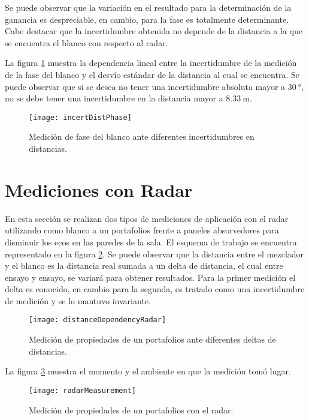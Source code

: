 Se puede observar que la variación en el resultado para la determinación de la ganancia es despreciable, en cambio, para la fase es totalmente determinante. Cabe destacar que la incertidumbre obtenida no depende de la distancia a la que se encuentra el blanco con respecto al radar.

La figura \ref{fig:incertDistSim} muestra la dependencia lineal entre la incertidumbre de la medición de la fase del blanco y el desvío estándar de la distancia al cual se encuentra. Se puede observar que si se desea no tener una incertidumbre absoluta mayor a $\SI{30}{\degree}$, no se debe tener una incertidumbre en la distancia mayor a $\SI{8.33}{\meter}$.
\begin{figure}[H]
  \centering
  \texttt{[image: incertDistPhase]}
  \caption{Medición de fase del blanco ante diferentes incertidumbres en distancias.}
  \label{fig:incertDistSim}
\end{figure}


\section{Mediciones con Radar}

En esta sección se realizan dos tipos de mediciones de aplicación con el radar utilizando como blanco a un portafolios frente a paneles absorvedores para disminuir los ecos en las paredes de la sala. El esquema de trabajo se encuentra representado en la figura \ref{fig:DistDependencySim2}. Se puede observar que la distancia entre el mezclador y el blanco es la distancia real sumada a un delta de distancia, el cual entre ensayo y ensayo, se variará para obtener resultados. Para la primer medición el delta es conocido, en cambio para la segunda, es tratado como una incertidumbre de medición y se lo mantuvo invariante.
\begin{figure}[htb]
  \centering
  \texttt{[image: distanceDependencyRadar]}
  \caption{Medición de propiedades de un portafolios ante diferentes deltas de distancias.}
  \label{fig:DistDependencySim2}
\end{figure}

La figura \ref{fig:radarMeasurement} muestra el momento y el ambiente en que la medición tomó lugar.
\begin{figure}[htb]
  \centering
  \texttt{[image: radarMeasurement]}
  \caption{Medición de propiedades de un portafolios con el radar.}
  \label{fig:radarMeasurement}
\end{figure}


